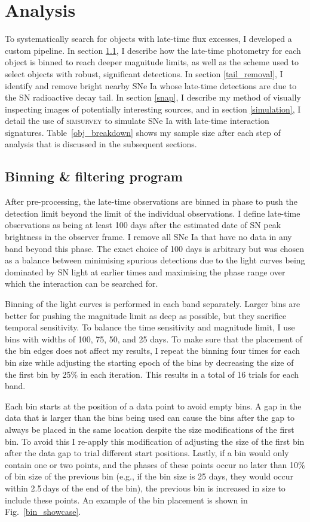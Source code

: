 \documentclass[a4paper,oneside,12pt, class=Latex/Classes/PhDthesisPSnPDF, crop=false]{standalone}
\begin{document}
\section{Analysis}
\label{DR2_analysis}
To systematically search for objects with late-time flux excesses, I developed a custom pipeline. In section \ref{pipeline}, I describe how the late-time photometry for each object is binned to reach deeper magnitude limits, as well as the scheme used to select objects with robust, significant detections. In section \ref{tail_removal}, I identify and remove bright nearby SNe Ia whose late-time detections are due to the SN radioactive decay tail. In section \ref{snap}, I describe my method of visually inspecting images of potentially interesting sources, and in section \ref{simulation}, I detail the use of \textsc{simsurvey} to simulate SNe Ia with late-time interaction signatures. Table~\ref{obj_breakdown} shows my sample size after each step of analysis that is discussed in the subsequent sections.


\subsection{Binning \& filtering program}
\label{pipeline}
After pre-processing, the late-time observations are binned in phase to push the detection limit beyond the limit of the individual observations. I define late-time observations as being at least 100 days after the estimated date of SN peak brightness in the observer frame. I remove all SNe Ia that have no data in any band beyond this phase. The exact choice of 100 days is arbitrary but was chosen as a balance between minimising spurious detections due to the light curves being dominated by SN light at earlier times and maximising the phase range over which the interaction can be searched for.

Binning of the light curves is performed in each band separately. Larger bins are better for pushing the magnitude limit as deep as possible, but they sacrifice temporal sensitivity. To balance the time sensitivity and magnitude limit, I use bins with widths of 100, 75, 50, and 25 days. To make sure that the placement of the bin edges does not affect my results, I repeat the binning four times for each bin size while adjusting the starting epoch of the bins by decreasing the size of the first bin by 25\% in each iteration. This results in a total of 16 trials for each band.

Each bin starts at the position of a data point to avoid empty bins. A gap in the data that is larger than the bins being used can cause the bins after the gap to always be placed in the same location despite the size modifications of the first bin. To avoid this I re-apply this modification of adjusting the size of the first bin after the data gap to trial different start positions. Lastly, if a bin would only contain one or two points, and the phases of these points occur no later than 10\% of bin size of the previous bin (e.g., if the bin size is 25 days, they would occur within 2.5\,days of the end of the bin), the previous bin is increased in size to include these points. An example of the bin placement is shown in Fig.~\ref{bin_showcase}.
\end{document}
